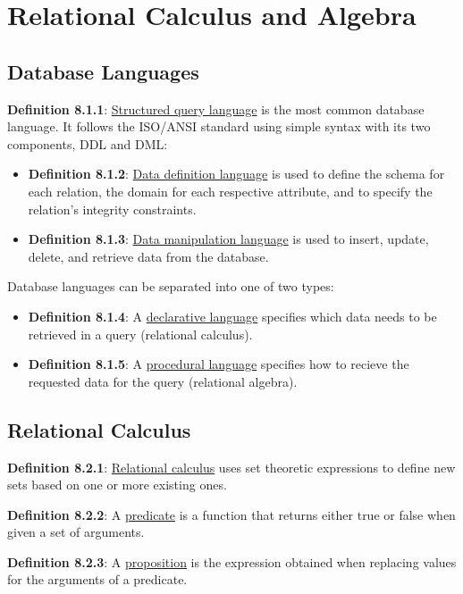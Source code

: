 \documentclass{article}
\newcommand{\separate}[1] {\vspace{#1 pt}\noindent}
\newcommand{\definition}[2]{\textbf{Definition #1}: #2\label{def:#1}}
\begin{document}
\section{Relational Calculus and Algebra}

\subsection{Database Languages}

\definition{8.1.1}{\underline{Structured query language} is the most common database language. It follows the ISO/ANSI standard using simple syntax with its two components, DDL and DML:}
\begin{itemize}
    \item \definition{8.1.2}{\underline{Data definition language} is used to define the schema for each relation, the domain for each respective attribute, and to specify the relation's integrity constraints.}
    \item \definition{8.1.3}{\underline{Data manipulation language} is used to insert, update, delete, and retrieve data from the database.}
\end{itemize}

\separate{5}Database languages can be separated into one of two types:
\begin{itemize}
    \item \definition{8.1.4}{A \underline{declarative language} specifies which data needs to be retrieved in a query (relational calculus).}
    \item \definition{8.1.5}{A \underline{procedural language} specifies how to recieve the requested data for the query (relational algebra).}
\end{itemize}

\newpage\subsection{Relational Calculus}

\definition{8.2.1}{\underline{Relational calculus} uses set theoretic expressions to define new sets based on one or more existing ones.}

\separate{5}\definition{8.2.2}{A \underline{predicate} is a function that returns either true or false when given a set of arguments.}

\separate{5}\definition{8.2.3}{A \underline{proposition} is the expression obtained when replacing values for the arguments of a predicate.}
\end{document}
